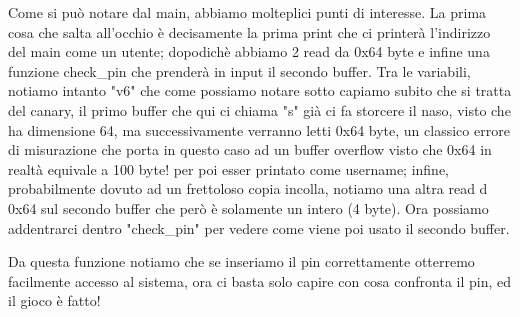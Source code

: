 \documentclass[main.tex]{subfiles}
\begin{document}
Come si può notare dal main, abbiamo molteplici punti di interesse. La prima cosa che salta all'occhio è decisamente la prima print che ci printerà l'indirizzo del main come un utente; dopodichè abbiamo 2 read da 0x64 byte e infine una funzione check\_pin che prenderà in input il secondo buffer.
Tra le variabili, notiamo intanto "v6" che come possiamo notare sotto capiamo subito che si tratta del canary, il primo buffer che qui ci chiama "s" già ci fa storcere il naso, visto che ha dimensione 64, ma successivamente verranno letti 0x64 byte, un classico errore di misurazione che porta in questo caso ad un buffer overflow visto che 0x64 in realtà equivale a 100 byte!
per poi esser printato come username; infine, probabilmente dovuto ad un frettoloso copia incolla, notiamo una altra read d 0x64 sul secondo buffer che però è solamente un intero (4 byte). Ora possiamo addentrarci dentro "check\_pin" per vedere come viene poi usato il secondo buffer.
\begin{figure}[h]
    \centering
    \captionsetup{aboveskip=0pt}
\end{figure}

Da questa funzione notiamo che se inseriamo il pin correttamente otterremo facilmente accesso al sistema, ora ci basta solo capire con cosa confronta il pin, ed il gioco è fatto!
\begin{figure}[h]
    \centering
    \captionsetup{aboveskip=0pt}
\end{figure}
\end{document}
